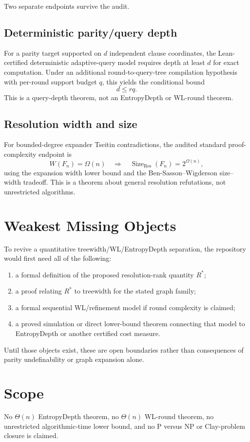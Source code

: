 \documentclass[11pt]{article}
\begin{document}
Two separate endpoints survive the audit.

\subsection*{Deterministic parity/query depth}
For a parity target supported on $d$ independent clause coordinates, the
Lean-certified deterministic adaptive-query model requires depth at least
$d$ for exact computation.  Under an additional round-to-query-tree
compilation hypothesis with per-round support budget $q$, this yields the
conditional bound
\[
d\le rq.
\]
This is a query-depth theorem, not an EntropyDepth or WL-round theorem.

\subsection*{Resolution width and size}
For bounded-degree expander Tseitin contradictions, the audited standard
proof-complexity endpoint is
\[
W(F_n)=\Omega(n)
\quad\Longrightarrow\quad
\operatorname{Size}_{\mathrm{Res}}(F_n)=2^{\Omega(n)},
\]
using the expansion width lower bound and the Ben-Sasson--Wigderson
size--width tradeoff.  This is a theorem about general resolution
refutations, not unrestricted algorithms.

\section{Weakest Missing Objects}

To revive a quantitative treewidth/WL/EntropyDepth separation, the repository
would first need all of the following:

\begin{enumerate}
\item a formal definition of the proposed resolution-rank quantity $R^*$;
\item a proof relating $R^*$ to treewidth for the stated graph family;
\item a formal sequential WL/refinement model if round complexity is claimed;
\item a proved simulation or direct lower-bound theorem connecting that model
      to EntropyDepth or another certified cost measure.
\end{enumerate}

Until those objects exist, these are open boundaries rather than consequences
of parity undefinability or graph expansion alone.

\section{Scope}

No $\Theta(n)$ EntropyDepth theorem, no $\Theta(n)$ WL-round theorem, no
unrestricted algorithmic-time lower bound, and no P versus NP or Clay-problem
closure is claimed.
\end{document}
